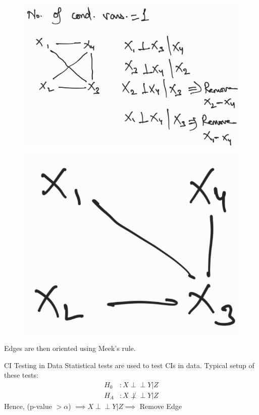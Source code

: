 \documentclass{beamer}
\def\ci{\perp\!\!\!\!\!\perp}
\begin{document}
\begin{frame}
	\begin{figure}
		\centering
		\includegraphics[scale=0.1]{imgs/example3.png}
	\end{figure}
	\begin{figure}
		\centering
		\includegraphics[scale=0.1]{imgs/example4.png}
	\end{figure}

	\center Edges are then oriented using Meek's rule.
\end{frame}

\begin{frame}{CI Testing in Data}
	Statistical tests are used to test CIs in data. Typical setup of these tests:
	\begin{equation*}
		\begin{split}
			H_0 &: X \ci Y \rvert Z \\
			H_A &: X \not \ci Y \rvert Z
		\end{split}
	\end{equation*}
	\vspace{2em}
	\center Hence, (p-value $ > \alpha $) $ \implies X \ci Y \rvert Z  \implies $ Remove Edge
\end{frame}
\end{document}
